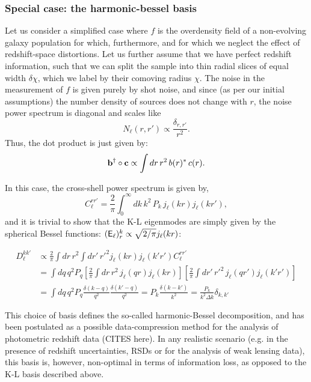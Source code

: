 \documentclass[twocolumn,amsfont,amssymb,amsmath, showpacs,balancelastpage, nofootinbib]{revtex4-1}
\begin{document}
    \subsubsection{Special case: the harmonic-bessel basis}\label{sssec:method.klbasis.bessel}
      Let us consider a simplified case where $f$ is the overdensity field of a non-evolving galaxy population for which, furthermore, and for which we neglect the effect of redshift-space distortions. Let us further assume that we have perfect redshift information, such that we can split the sample into thin radial slices of equal width $\delta \chi$, which we label by their comoving radius $\chi$. The noise in the measurement of $f$ is given purely by shot noise, and since (as per our initial assumptions) the number density of sources does not change with $r$, the noise power spectrum is diagonal and scales like 
      \begin{equation}
        N_\ell(r,r')\propto \frac{\delta_{r,r'}}{r^2}.
      \end{equation}
      Thus, the dot product is just given by:
      \begin{equation}
        {\bf b}^\dag\circ{\bf c}\propto\int dr\,r^2\,b(r)^*\,c(r).
      \end{equation}
    
      In this case, the cross-shell power spectrum is given by,
      \begin{equation}
        C_\ell^{rr'}=\frac{2}{\pi}\int_0^\infty dk\,k^2\,P_k\,j_\ell(kr)j_\ell(kr'),
      \end{equation}
      and it is trivial to show that the K-L eigenmodes are simply given by the spherical Bessel functions: $({\sf E}_\ell)^k_r\propto \sqrt{2/\pi}j_\ell(kr)$:
      \begin{widetext}
      \begin{align}
        D_\ell^{kk'}&\propto\frac{2}{\pi}\int dr\,r^2\int dr'\,r'^2 j_\ell(kr)j_\ell(k'r') C_\ell^{rr'}\\
        &=\int dq\,q^2P_q\left[\frac{2}{\pi}\int dr\,r^2\,j_\ell(qr)j_\ell(kr)\right]\left[\frac{2}{\pi}\int dr'\,r'^2\,j_\ell(qr')j_\ell(k'r')\right]\\
        &=\int dq\,q^2P_q\frac{\delta(k-q)}{q^2}\frac{\delta(k'-q)}{q^2}=P_k\frac{\delta(k-k')}{k^2}=\frac{P_k}{k^2\Delta k}\delta_{k,k'}
      \end{align}
      \end{widetext}
   
      This choice of basis defines the so-called harmonic-Bessel decomposition, and has been postulated as a possible data-compression method for the analysis of photometric redshift data (CITES here). In any realistic scenario (e.g. in the presence of redshift uncertainties, RSDs or for the analysis of weak lensing data), this basis is, however, non-optimal in terms of information loss, as opposed to the K-L basis described above.
\end{document}
